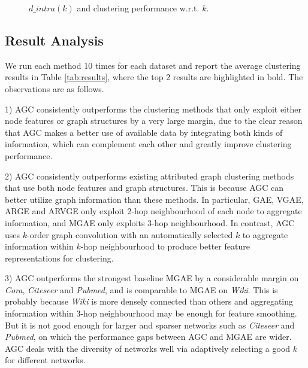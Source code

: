 \documentclass{article}
\begin{document}
\begin{figure}[t]
\centering
{}
\hfil
{}
\caption{$d\_intra(k)$ and clustering performance w.r.t. $k$.}
\label{fig:k}
\end{figure}



\subsection{Result Analysis}

We run each method 10 times for each dataset and report the average clustering results in Table \ref{tab:results}, where the top 2 results are highlighted in bold. The observations are as follows.

1) AGC consistently outperforms the clustering methods that only exploit either node features or graph structures by a very large margin, due to the clear reason that AGC makes a better use of available data by integrating both kinds of information, which can complement each other and greatly improve clustering performance.


2) AGC consistently outperforms existing attributed graph clustering methods that use both node features and graph structures. This is because AGC can better utilize graph information than these methods. In particular, GAE, VGAE, ARGE and ARVGE only exploit 2-hop neighbourhood of each node to aggregate information, and MGAE only exploits 3-hop neighbourhood. In contrast, AGC uses $k$-order graph convolution with an automatically selected $k$ to aggregate information within $k$-hop neighbourhood to produce better feature representations for clustering.

3) AGC outperforms the strongest baseline MGAE by a considerable margin on \emph{Cora}, \emph{Citeseer} and \emph{Pubmed}, and is comparable to MGAE on \emph{Wiki}. This is probably because \emph{Wiki} is more densely connected than others and aggregating information within 3-hop neighbourhood may be enough for feature smoothing. But it is not good enough for larger and sparser networks such as \emph{Citeseer} and \emph{Pubmed}, on which the performance gaps between AGC and MGAE are wider. AGC deals with the diversity of networks well via adaptively selecting a good $k$ for different networks.
\end{document}
